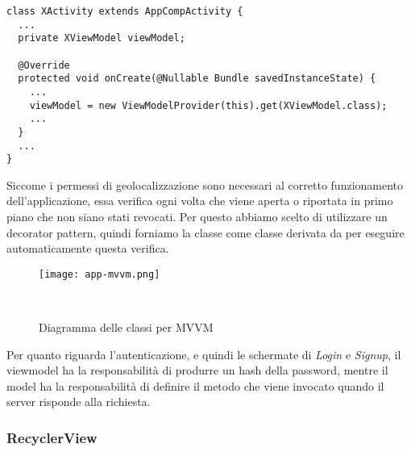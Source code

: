 \documentclass[../../manuale-manutentore.tex]{subfiles}
\begin{document}
\begin{verbatim}
class XActivity extends AppCompActivity {
  ...
  private XViewModel viewModel;

  @Override
  protected void onCreate(@Nullable Bundle savedInstanceState) {
    ...
    viewModel = new ViewModelProvider(this).get(XViewModel.class);
    ...
  }
  ...
}
\end{verbatim}

Siccome i permessi di geolocalizzazione sono necessari al corretto funzionamento dell'applicazione, essa verifica ogni volta che viene aperta o riportata in primo piano che non siano stati revocati.
Per questo abbiamo scelto di utilizzare un decorator pattern, quindi forniamo la classe  come classe derivata da  per eseguire automaticamente questa verifica.

\begin{figure}[ht]
  \centering
  \texttt{[image: app-mvvm.png]}
  \caption{Diagramma delle classi per MVVM}
~~\label{fig:app/diagramma_classi_mvvm}
\end{figure}

Per quanto riguarda l'autenticazione, e quindi le schermate di \textit{Login} e \textit{Signup}, il viewmodel ha la responsabilità di produrre un hash della password, mentre il model ha la responsabilità di definire il metodo  che viene invocato quando il server risponde alla richiesta.

\subsubsection{RecyclerView}%
\label{subs:recyclerview}
\end{document}
